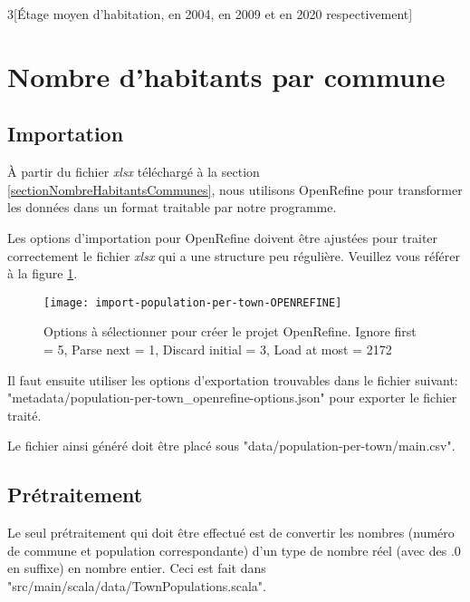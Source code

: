 \begin{center}
\begin{multicols}{3}[Étage moyen d'habitation, en 2004, en 2009 et en 2020 respectivement]
\end{multicols}
\end{center}

\section{Nombre d'habitants par commune}
\subsection{Importation}

À partir du fichier \textit{xlsx} téléchargé à la section \ref{sectionNombreHabitantsCommunes}, nous utilisons OpenRefine pour transformer les données dans un format traitable par notre programme.

Les options d'importation pour OpenRefine doivent être ajustées pour traiter correctement le fichier \textit{xlsx} qui a une structure peu régulière. Veuillez vous référer à la figure \ref{fig:importPopulationPerTownOpenRefine}.

\begin{figure}[H]
    \centering
    \texttt{[image: import-population-per-town-OPENREFINE]}
    \caption{Options à sélectionner pour créer le projet OpenRefine. Ignore first = 5, Parse next = 1, Discard initial = 3, Load at most = 2172}
    \label{fig:importPopulationPerTownOpenRefine}
\end{figure}

Il faut ensuite utiliser les options d'exportation trouvables dans le fichier suivant: "metadata/population-per-town\_openrefine-options.json" pour exporter le fichier traité.

Le fichier ainsi généré doit être placé sous "data/population-per-town/main.csv".

\subsection{Prétraitement}
Le seul prétraitement qui doit être effectué est de convertir les nombres (numéro de commune et population correspondante) d'un type de nombre réel (avec des $.0$ en suffixe) en nombre entier. Ceci est fait dans "src/main/scala/data/TownPopulations.scala".